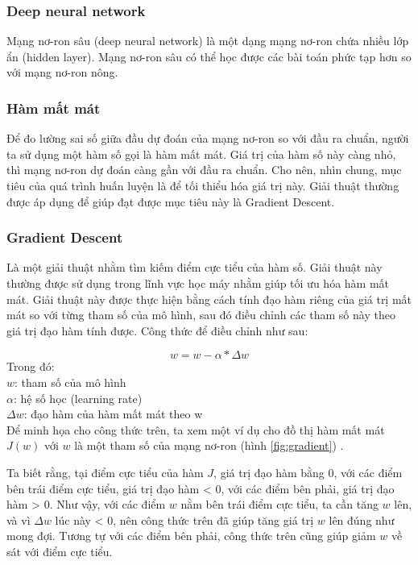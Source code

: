 \documentclass[a4paper,14pt]{extreport}
\begin{document}
\subsubsection*{Deep neural network }
Mạng nơ-ron sâu (deep neural network) là một dạng mạng nơ-ron chứa nhiều lớp ẩn (hidden layer). 
Mạng nơ-ron sâu có thể học được các bài toán phức tạp hơn so với mạng nơ-ron nông.

\subsubsection*{ Hàm mất mát }
Để đo lường sai số giữa đầu dự đoán của mạng nơ-ron so với đầu ra chuẩn, người ta sử dụng một hàm số gọi là hàm mất mát.
 Giá trị của hàm số này càng nhỏ, thì mạng nơ-ron dự đoán càng gần với đầu ra chuẩn. Cho nên, nhìn chung, 
 mục tiêu của quá trình huấn luyện là để tối thiểu hóa giá trị này. Giải thuật thường được áp dụng để giúp đạt 
 được mục tiêu này là Gradient Descent.

\subsubsection*{ Gradient Descent }
Là một giải thuật nhằm tìm kiếm điểm cực tiểu của hàm số. Giải thuật này thường được sử dụng trong lĩnh 
vực học máy nhằm giúp tối ưu hóa hàm mất mát. Giải thuật này được thực hiện bằng cách tính đạo hàm riêng 
của giá trị mất mát so với từng tham số của mô hình, sau đó điều chỉnh các tham số này theo giá trị đạo hàm tính được. 
Công thức để điều chỉnh như sau:

\[ w = w - \alpha * \Delta w\]
Trong đó: \\
$ w $: tham số của mô hình \\
$ \alpha $: hệ số học (learning rate) \\
$ \Delta w $: đạo hàm của hàm mất mát theo w \\

Để minh họa cho công thức trên, ta xem một ví dụ cho đồ thị hàm mất mát $J(w)$ với $w$ là một tham số của mạng nơ-ron (hình \ref{fig:gradient}) . \cite{gradient-descent}

Ta biết rằng, tại điểm cực tiểu của hàm $J$, giá trị đạo hàm bằng 0, với các điểm bên trái điểm cực tiểu, giá trị đạo hàm < 0, với các điểm bên phải, giá trị đạo hàm > 0. Như vậy, với các điểm $w$ nằm bên trái điểm cực tiểu, ta cần tăng $w$ lên, và vì $\Delta w$ lúc này < 0, nên công thức trên đã giúp tăng giá trị $w$ lên đúng như mong đợi. Tương tự với các điểm bên phải, công thức trên cũng giúp giảm $w$ về sát với điểm cực tiểu.
\end{document}
